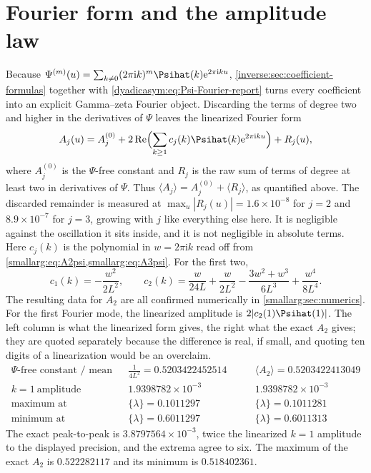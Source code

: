 \documentclass[11pt,oneside]{article}
\theoremstyle{definition}
\theoremstyle{remark}
\newcommand{\e}{\mathrm e}
\newcommand{\ii}{\mathrm i}
\begin{document}
\section{Fourier form and the amplitude law}\label{smallarg:sec:fourier}

Because $\Psi^{(m)}(u)=\sum_{k\ne0}(2\pi\ii k)^m\Psihat(k)\e^{2\pi\ii ku}$,
\cref{inverse:sec:coefficient-formulas} together with \cref{dyadicasym:eq:Psi-Fourier-report} turns every coefficient into
an explicit Gamma--zeta Fourier object.  Discarding the terms of degree two
and higher in the derivatives of $\Psi$ leaves the linearized Fourier form
\[
  A_j(u)=A_j^{(0)}
   +2\operatorname{Re}\Bigl(\sum_{k\ge1}c_j(k)\Psihat(k)\e^{2\pi\ii ku}\Bigr)
   +R_j(u),
\]
where \(A_j^{(0)}\) is the \(\Psi\)-free constant and \(R_j\) is the raw sum of
terms of degree at least two in derivatives of \(\Psi\).  Thus
\(\langle A_j\rangle=A_j^{(0)}+\langle R_j\rangle\), as quantified above.  The
discarded remainder is measured at
$\max_u|R_j(u)|=1.6\times10^{-8}$ for $j=2$ and $8.9\times10^{-7}$ for
$j=3$, growing with $j$ like everything else here.  It is negligible against
the oscillation it sits inside, and it is not negligible in absolute terms.
Here $c_j(k)$ is the polynomial in $w=2\pi\ii k$ read off from
\cref{smallarg:eq:A2psi,smallarg:eq:A3psi}.  For the first two,
\[
  c_1(k)=-\frac{w^2}{2L^2},
  \qquad
  c_2(k)=\frac{w}{24L}+\frac{w}{2L^2}-\frac{3w^2+w^3}{6L^3}+\frac{w^4}{8L^4}.
\]
The resulting data for $A_2$ are all confirmed numerically in
\cref{smallarg:sec:numerics}.
For the first Fourier mode, the linearized amplitude is
$2|c_2(1)\Psihat(1)|$.  The left column is what the linearized form gives, the right what the exact
$A_2$ gives; they are quoted separately because the difference is real, if
small, and quoting ten digits of a linearization would be an overclaim.
\[
\begin{aligned}
  \text{\(\Psi\)-free constant / mean}&&\tfrac1{4L^2}=0.5203422452514&\qquad
    \langle A_2\rangle=0.5203422413049\\
  k=1\ \text{amplitude}&&1.9398782\times10^{-3}&\qquad
    1.9398782\times10^{-3}\\
  \text{maximum at}&&\{\lambda\}=0.1011297&\qquad\{\lambda\}=0.1011281\\
  \text{minimum at}&&\{\lambda\}=0.6011297&\qquad\{\lambda\}=0.6011313
\end{aligned}
\]
The exact peak-to-peak is $3.8797564\times10^{-3}$, twice the linearized
$k=1$ amplitude to the displayed precision, and the extrema agree to six.  The
maximum of the exact $A_2$ is $0.522282117$ and its minimum is
$0.518402361$.
\end{document}
